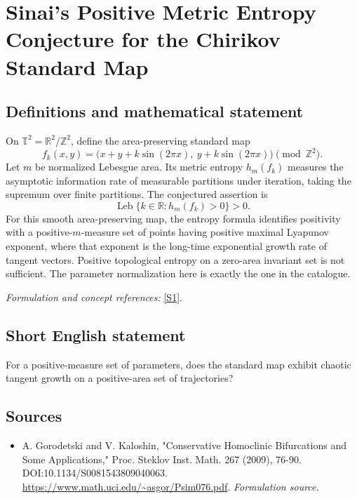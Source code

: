 \documentclass[11pt]{article}
\begin{document}
\section*{\texorpdfstring{Sinai's Positive Metric Entropy Conjecture for the Chirikov Standard Map}{Sinai's Positive Metric Entropy Conjecture for the Chirikov Standard Map}}\label{30006866}
\subsection{Definitions and mathematical statement}
On $\mathbb T^2={\mathbb{R}}^2/{\mathbb{Z}}^2$, define the area-preserving standard map
\[
 f_k(x,y)=\bigl(x+y+k\sin(2\pi x),\ y+k\sin(2\pi x)\bigr)\pmod{{\mathbb{Z}}^2}.
\]
Let $m$ be normalized Lebesgue area. Its metric entropy $h_m(f_k)$ measures the asymptotic information rate of measurable partitions under iteration, taking the supremum over finite partitions. The conjectured assertion is
\[
 \operatorname{Leb}\{k\in{\mathbb{R}}:h_m(f_k)>0\}>0.
\]
For this smooth area-preserving map, the entropy formula identifies positivity with a positive-$m$-measure set of points having positive maximal Lyapunov exponent, where that exponent is the long-time exponential growth rate of tangent vectors. Positive topological entropy on a zero-area invariant set is not sufficient. The parameter normalization here is exactly the one in the catalogue.
\par\smallskip\textit{Formulation and concept references:} \href{https://www.math.uci.edu/~asgor/Psim076.pdf}{[S1]}.

\subsection{Short English statement}
For a positive-measure set of parameters, does the standard map exhibit chaotic tangent growth on a positive-area set of trajectories?
\subsection{Sources}
\begin{itemize}
\item[S1]A. Gorodetski and V. Kaloshin, "Conservative Homoclinic Bifurcations and Some Applications," Proc. Steklov Inst. Math. 267 (2009), 76-90. DOI:10.1134/S0081543809040063.
\url{https://www.math.uci.edu/~asgor/Psim076.pdf}.
\textit{Formulation source.}
\end{itemize}
\end{document}

